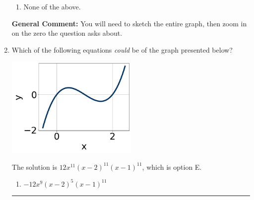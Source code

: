\documentclass{extbook}[14pt]
\newcommand{\litem}[1]{\item #1

\rule{\textwidth}{0.4pt}}
\begin{document}
\begin{enumerate}
{\begin{enumerate}[label=\Alph*.]
\item None of the above.\end{enumerate}
\textbf{General Comment:} You will need to sketch the entire graph, then zoom in on the zero the question asks about.
}
\litem{
Which of the following equations \textit{could} be of the graph presented below?

\begin{center}
    \includegraphics[width=0.5\textwidth]{../Figures/polyGraphToFunctionCopyB.png}
\end{center}


The solution is \( 12x^{11} (x - 2)^{11} (x - 1)^{11} \), which is option E.\begin{enumerate}[label=\Alph*.]
\item \( -12x^{9} (x - 2)^{5} (x - 1)^{11} \)


\end{enumerate}}
\end{enumerate}
\end{document}
